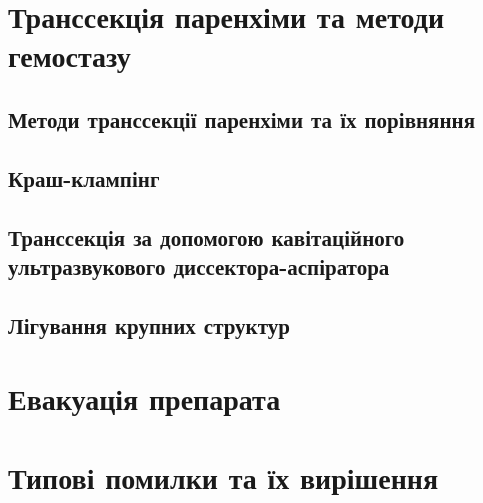 \begin{refsection}
\section{Транссекція паренхіми та методи гемостазу}

\subsection{Методи транссекції паренхіми та їх порівняння}

\subsection{Краш-клампінг}

\subsection{Транссекція за допомогою кавітаційного ультразвукового диссектора-аспіратора}

\subsection{Лігування крупних структур}

\section{Евакуація препарата}

\section{Типові помилки та їх вирішення}

\printbibliography [heading=subbibliography]
\end{refsection}